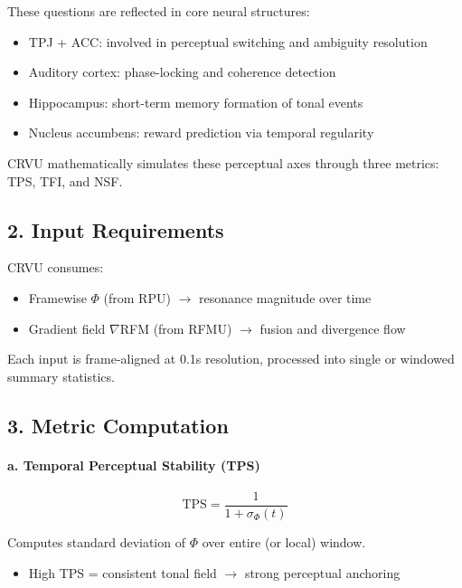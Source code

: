 These questions are reflected in core neural structures:

\begin{itemize}
    \item TPJ + ACC: involved in perceptual switching and ambiguity resolution
    \item Auditory cortex: phase-locking and coherence detection
    \item Hippocampus: short-term memory formation of tonal events
    \item Nucleus accumbens: reward prediction via temporal regularity
\end{itemize}

CRVU mathematically simulates these perceptual axes through three metrics: TPS, TFI, and NSF.

\subsection*{2. Input Requirements}

CRVU consumes:

\begin{itemize}
    \item Framewise $\Phi$ (from RPU) $\rightarrow$ resonance magnitude over time
    \item Gradient field $\nabla$RFM (from RFMU) $\rightarrow$ fusion and divergence flow
\end{itemize}

Each input is frame-aligned at 0.1s resolution, processed into single or windowed summary statistics.

\subsection*{3. Metric Computation}

\paragraph{a. Temporal Perceptual Stability (TPS)}

\[
\text{TPS} = \frac{1}{1 + \sigma_\Phi(t)}
\]

Computes standard deviation of $\Phi$ over entire (or local) window.

\begin{itemize}
    \item High TPS = consistent tonal field $\rightarrow$ strong perceptual anchoring
\end{itemize}

